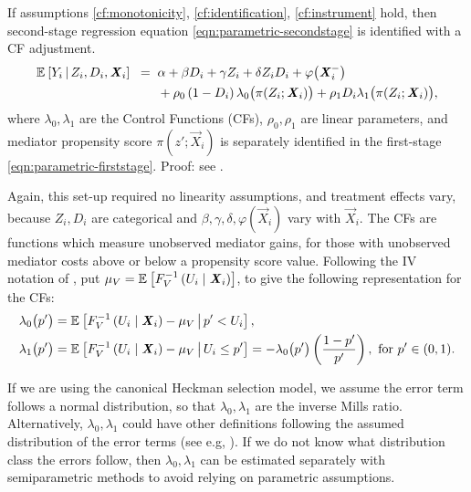 \begin{proposition}
    \label{proposition:secondstage}
    If assumptions \ref{cf:monotonicity}, \ref{cf:identification}, \ref{cf:instrument} hold, then second-stage regression equation \eqref{eqn:parametric-secondstage} is identified with a CF adjustment.
    \begin{align*}
        \mathbb{E}_{} \left[ Y_i \, \middle\vert \, Z_i, D_i, \boldsymbol{\mathit{X}}_i \right] \;\; =& \;\;
            \alpha
            + \beta D_i
            + \gamma Z_i
            + \delta Z_i D_i
            + \varphi\big(\boldsymbol{\mathit{X}}_i^-\big) \\
            & \;\; +  \rho_0 \left( 1 - D_i \right) \lambda_0 \big( \pi(Z_i ; \boldsymbol{\mathit{X}}_i) \big)
                + \rho_1 D_i \lambda_1 \big( \pi(Z_i ; \boldsymbol{\mathit{X}}_i) \big),
            \label{eqn:cf-secondstage}
    \end{align*}
    where $\lambda_0, \lambda_1$ are the Control Functions (CFs), $\rho_0, \rho_1$ are linear parameters, and mediator propensity score $\pi(z';\vec X_i)$ is separately identified in the first-stage \eqref{eqn:parametric-firststage}.
    Proof: see .
\end{proposition}
Again, this set-up required no linearity assumptions, and treatment effects vary, because $Z_i, D_i$ are categorical and  $\beta, \gamma, \delta , \varphi(\vec X_i)$ vary with $\vec X_i$.
The CFs are functions which measure unobserved mediator gains, for those with unobserved mediator costs above or below a propensity score value.
Following the IV notation of \cite{kline2019heckits}, put $\mu_V = \mathbb{E}_{} \left[ F_V^{-1}\left( U_i \mid \boldsymbol{\mathit{X}}_i \right) \right]$, to give the following representation for the CFs:
\begin{align*}
    \lambda_0\big(p'\big) &=
        \mathbb{E}_{} \left[  F_V^{-1}\left( U_i \mid \boldsymbol{\mathit{X}}_i \right) - \mu_V \, \middle\vert \, p' < U_i \right], \\
    \lambda_1\big(p'\big) &=
        \mathbb{E}_{} \left[  F_V^{-1}\left( U_i \mid \boldsymbol{\mathit{X}}_i \right) - \mu_V \, \middle\vert \, U_i \leq p' \right] = 
            -\lambda_0\big( p' \big) \left(\frac{1-p'}{p'}\right), \text{ for } p' \in (0,1).
\end{align*}

If we are using the canonical Heckman selection model, we assume the error term follows a normal distribution, so that $\lambda_0, \lambda_1$ are the inverse Mills ratio.
Alternatively, $\lambda_0, \lambda_1$ could have other definitions following the assumed distribution of the error terms (see e.g, \citealt{wooldridge2015control}).
If we do not know what distribution class the errors follow, then $\lambda_0, \lambda_1$ can be estimated separately with semiparametric methods to avoid relying on parametric assumptions.

